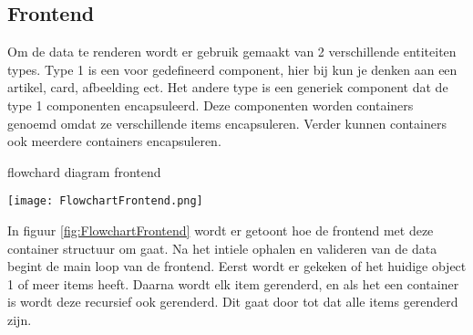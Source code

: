 \newpage
\subsection{Frontend}

\whitespace
Om de data te renderen wordt er gebruik gemaakt van 2 verschillende entiteiten types.
Type 1 is een voor gedefineerd component, hier bij kun je denken aan een artikel, card, afbeelding ect.
Het andere type is een generiek component dat de type 1 componenten encapsuleerd.
Deze componenten worden containers genoemd omdat ze verschillende items encapsuleren.
Verder kunnen containers ook meerdere containers encapsuleren.

\whitespace
\begin{graphic}
    \captionsetup{type=figure}
    \caption{flowchard diagram frontend}
    \texttt{[image: FlowchartFrontend.png]}
    \label{fig:FlowchartFrontend}
\end{graphic}

\whitespace
In figuur \ref{fig:FlowchartFrontend} wordt er getoont hoe de frontend met deze container structuur om gaat.
Na het intiele ophalen en valideren van de data begint de main loop van de frontend.
Eerst wordt er gekeken of het huidige object 1 of meer items heeft.
Daarna wordt elk item gerenderd, en als het een container is wordt deze recursief ook gerenderd.
Dit gaat door tot dat alle items gerenderd zijn.

